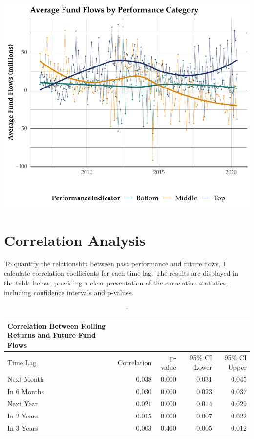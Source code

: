 \documentclass[11pt,preprint, authoryear]{elsarticle}
\numberwithin{equation}{section}
\numberwithin{figure}{section}
\numberwithin{table}{section}
\begin{document}
\includegraphics{Question-4_files/figure-latex/unnamed-chunk-2-1.pdf}

\hypertarget{correlation-analysis}{%
\section{Correlation Analysis}\label{correlation-analysis}}

To quantify the relationship between past performance and future flows,
I calculate correlation coefficients for each time lag. The results are
displayed in the table below, providing a clear presentation of the
correlation statistics, including confidence intervals and p-values.

\begin{longtable}{lrrrr}
\caption*{
{\large Correlation Between Rolling Returns and Future Fund Flows}
} \\ 
\toprule
Time Lag & Correlation & p-value & 95\% CI Lower & 95\% CI Upper \\ 
\midrule
Next Month & $0.038$ & $0.000$ & $0.031$ & $0.045$ \\ 
In 6 Months & $0.030$ & $0.000$ & $0.023$ & $0.037$ \\ 
Next Year & $0.021$ & $0.000$ & $0.014$ & $0.029$ \\ 
In 2 Years & $0.015$ & $0.000$ & $0.007$ & $0.022$ \\ 
In 3 Years & $0.003$ & $0.460$ & $-0.005$ & $0.012$ \\ 
\bottomrule
\end{longtable}
\end{document}
